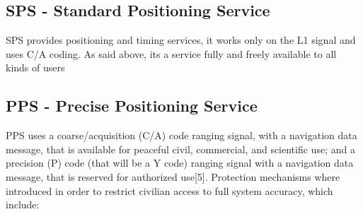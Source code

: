 \documentclass[conference]{IEEEtran}
\begin{document}
\subsection{SPS - Standard Positioning Service}

SPS provides positioning and timing services, it works only on the L1 signal and uses C/A coding. As said above, its a service fully and freely available to all kinds of users

\subsection{PPS - Precise Positioning Service}

PPS uses a coarse/acquisition (C/A) code ranging signal, with a navigation data message, that is available for peaceful civil, commercial, and scientific use; and a precision (P) code (that will be a Y code) ranging signal with a navigation data message, that is reserved for authorized use[5].
Protection mechanisms where introduced in order to restrict civilian access to full system accuracy, which include:
\bigbreak
\end{document}
